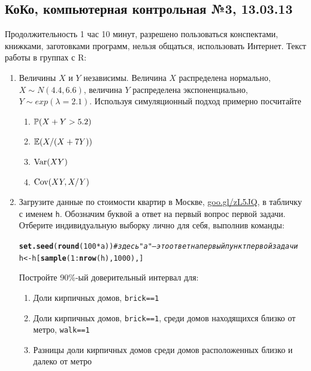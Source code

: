 \documentclass[12pt, a4paper]{article}\usepackage[]{graphicx}\usepackage[]{color}
\makeatletter
\newcommand{\hlnum}[1]{\textcolor[rgb]{0.686,0.059,0.569}{#1}}%
\newcommand{\hlcom}[1]{\textcolor[rgb]{0.678,0.584,0.686}{\textit{#1}}}%
\newcommand{\hlopt}[1]{\textcolor[rgb]{0,0,0}{#1}}%
\newcommand{\hlstd}[1]{\textcolor[rgb]{0.345,0.345,0.345}{#1}}%
\newcommand{\hlkwb}[1]{\textcolor[rgb]{0.69,0.353,0.396}{#1}}%
\newcommand{\hlkwd}[1]{\textcolor[rgb]{0.737,0.353,0.396}{\textbf{#1}}}%
\newenvironment{kframe}{%
 \def\at@end@of@kframe{}%
 \ifinner\ifhmode%
  \def\at@end@of@kframe{\end{minipage}}%
  \begin{minipage}{\columnwidth}%
 \fi\fi%
 \def\FrameCommand##1{\hskip\@totalleftmargin \hskip-\fboxsep
 \colorbox{shadecolor}{##1}\hskip-\fboxsep
     \hskip-\linewidth \hskip-\@totalleftmargin \hskip\columnwidth}%
 \MakeFramed {\advance\hsize-\width
   \@totalleftmargin\z@ \linewidth\hsize
   \@setminipage}}%
 {\par\unskip\endMakeFramed%
 \at@end@of@kframe}
\newenvironment{knitrout}{}{} %
\makeatother
\begin{document}
\subsection{КоКо, компьютерная контрольная №3, 13.03.13}

Продолжительность 1 час 10 минут, разрешено пользоваться конспектами, книжками, заготовками программ, нельзя общаться, использовать Интернет. Текст работы в группах с R:

\begin{enumerate}
\item Величины $X$ и $Y$ независимы. Величина $X$ распределена нормально, $X\sim N(4.4,6.6)$, величина $Y$ распределена экспоненциально, $Y\sim exp(\lambda=2.1)$. Используя симуляционный подход примерно посчитайте

\begin{enumerate}
\item $\P(X+Y>5.2)$
\item $\E(X/(X+7Y))$
\item $\Var(XY)$
\item $\Cov(XY,X/Y)$
\end{enumerate}

\item Загрузите данные по стоимости квартир в Москве, \href{http://goo.gl/zL5JQ}{goo.gl/zL5JQ}, в табличку с именем \verb|h|. Обозначим буквой \verb|a| ответ на первый вопрос первой задачи. Отберите индивидуальную выборку лично для себя, выполнив команды:
\begin{knitrout}
\color{fgcolor}\begin{kframe}
\begin{alltt}
\hlkwd{set.seed}\hlstd{(}\hlkwd{round}\hlstd{(}\hlnum{100} \hlopt{*} \hlstd{a))} \hlcom{# здесь "a" — это ответ на первый пункт первой задачи}
\hlstd{h} \hlkwb{<-} \hlstd{h[}\hlkwd{sample}\hlstd{(}\hlnum{1}\hlopt{:}\hlkwd{nrow}\hlstd{(h),} \hlnum{1000}\hlstd{), ]}
\end{alltt}
\end{kframe}
\end{knitrout}

Постройте 90\%-ый доверительный интервал для:
\begin{enumerate}
\item Доли кирпичных домов, \verb|brick==1|
\item Доли кирпичных домов, \verb|brick==1|, среди домов находящихся близко от метро,  \verb|walk==1|
\item Разницы доли кирпичных домов среди домов расположенных близко и далеко от метро
\end{enumerate}



\end{enumerate}
\end{document}
